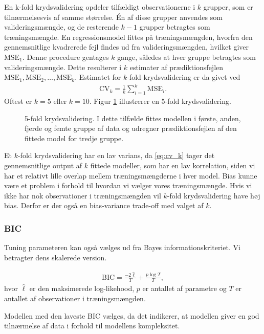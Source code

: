 En k-fold krydsvalidering opdeler tilfældigt observationerne i \(k\) grupper, som er tilnærmelsesvis af samme størrelse.
Én af disse grupper anvendes som valideringsmængde, og de resterende \(k-1\) grupper betragtes som træningsmængde.
En regressionsmodel fittes på træningsmængden, hvorfra den gennemsnitlige kvadrerede fejl findes ud fra valideringsmængden, hvilket giver \(\text{MSE}_1\).
Denne procedure gentages \(k\) gange, således at hver gruppe betragtes som valideringsmængde.
Dette resulterer i \(k\) estimater af prædiktionsfejlen $\text{MSE}_1, \text{MSE}_2, \dots , \text{MSE}_k$.
Estimatet for \(k\)-fold krydsvalidering er da givet ved
\begin{align}
\text{CV}_k = \frac{1}{k} \sum_{i=1}^k \text{MSE}_i. \label{eq:cv_k}
\end{align}
Oftest er $k=5$ eller $k = 10$. 
Figur \ref{fig:cv_teori} illustrerer en 5-fold krydsvalidering. 
%
\begin{figure}
\center
\scalebox{0.6}{}
\caption{5-fold krydsvalidering. I dette tilfælde fittes modellen i første, anden, fjerde og femte gruppe af data og udregner prædiktionsfejlen af den fittede model for tredje gruppe.} \label{fig:cv_teori}
\end{figure} 
%
Et $k$-fold krydsvalidering har en lav varians, da \eqref{eq:cv_k} tager det gennemsnitlige output af $k$ fittede modeller, som har en lav korrelation, siden vi har et relativt lille overlap mellem træningsmængderne i hver model. 
Bias kunne være et problem i forhold til hvordan vi vælger vores træningsmængde. Hvis vi ikke har nok observationer i træningsmængden vil $k$-fold krydsvalidering have høj bias. Derfor er der også en bias-variance trade-off med valget af $k$. 

\subsubsection{BIC}
Tuning parameteren kan også vælges ud fra Bayes informationskriteriet.
Vi betragter dens skalerede version.
%
\begin{defn} \label{def:bic}
\begin{align*}
\text{BIC} =  \frac{- 2 \widehat{\ell}}{T} + \frac{p \log T}{T}, 
\end{align*}
hvor \(\widehat{\ell}\) er den maksimerede log-likehood, \(p\) er antallet af parametre og \(T\) er antallet af observationer i træningsmængden.
\end{defn} 
%
Modellen med den laveste BIC vælges, da det indikerer, at modellen giver en god tilnærmelse af data i forhold til modellens kompleksitet. 

